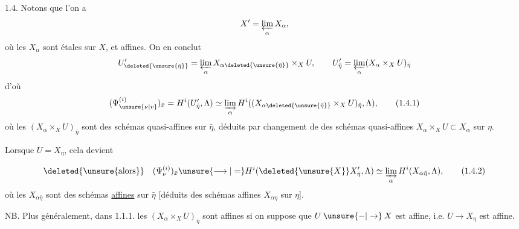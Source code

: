 1.4. Notons que l'on a
\[
X'=\varprojlim_\alpha X_\alpha,
\]
où les $X_\alpha$ sont étales sur $X$, et affines. On en conclut
\[
U'_{\deleted{\unsure{\bar\eta}}}=\varprojlim_\alpha X_{\alpha\deleted{\unsure{\bar\eta}}}\times_X U,\qquad
U'_{\bar\eta}=\varprojlim_\alpha(X_\alpha\times_X U)_{\bar\eta}
\]
d'où
\[
(\Psi^{(i)}_{\unsure{\nu|v}})_{\bar x}=H^i(U'_{\bar\eta},\Lambda)\simeq
\varinjlim_\alpha H^i((X_{\alpha\deleted{\unsure{\bar\eta}}}\times_X U)_{\bar\eta},\Lambda),
\tag*{(1.4.1)}
\]
où les  $(X_\alpha\times_X U)_{\bar\eta}$ sont des schémas  quasi-affines sur $\bar\eta$, déduits par changement de  des schémas quasi-affines $X_\alpha\times_X U\subset X_\alpha$ sur $\eta$.

Lorsque $U=X_\eta$, cela devient

\[
\deleted{\unsure{\text{alors}}}\quad
(\Psi^{(i)}_\nu)_{\bar x}\unsure{\longrightarrow|=}H^i(\deleted{\unsure{X}}X'_{\bar\eta},\Lambda)\simeq
\varinjlim_\alpha H^i(X_{\alpha\bar\eta},\Lambda),
\tag*{(1.4.2)}
\]
où les $X_{\alpha\bar\eta}$ sont des schémas  \uline{affines} sur $\bar\eta$ [déduits des schémas affines $X_{\alpha\eta}$ sur $\eta$]. 

NB. Plus généralement, dans 1.1.1. les $(X_\alpha\times_X U)_{\bar\eta}$ sont affines si on suppose que $U\mathbin{\unsure{-|\to}}X$ est affine, i.e. $U\to X_\eta$ est affine.
